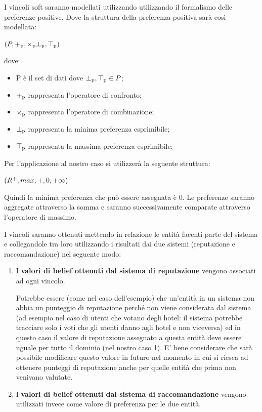 \documentclass[letterpaper]{article} %
\begin{document}
I vincoli soft saranno modellati utilizzando utilizzando il formalismo delle preferenze positive. Dove la struttura della preferenza positiva sarà così modellata:
\newline

$(P, +\textsubscript{p}, \times\textsubscript{p} \bot\textsubscript{p}, \top\textsubscript{p})$
\newline

dove:
\begin{itemize}
	\item
	P è il set di dati dove $\bot\textsubscript{p}, \top\textsubscript{p} \in P$;
	\item
	$+\textsubscript{p}$ rappresenta l'operatore di confronto;
	\item
	$\times\textsubscript{p}$ rappresenta l'operatore di combinazione;
	\item
	$\bot\textsubscript{p}$ rappresenta la minima preferenza esprimibile;
	\item
	$\top\textsubscript{p}$ rappresenta la massima preferenza esprimibile;
\end{itemize}


Per l'applicazione al nostro caso si utilizzerà la seguente struttura:
\newline

$(R\textsuperscript{+}, max, +, 0, +\infty)$
\newline

Quindi la minima preferenza che può essere assegnata è 0. Le preferenze saranno aggregate attraverso la somma e saranno successivamente comparate attraverso l'operatore di massimo. 

I vincoli saranno ottenuti mettendo in relazione le entità facenti parte del sistema e collegandole tra loro utilizzando i risultati dai due sistemi (reputazione e raccomandazione) nel seguente modo:

\begin{enumerate}
	\item 
	I \textbf{valori di belief ottenuti dal sistema di reputazione} vengono associati ad ogni vincolo. 
	
	Potrebbe essere (come nel caso dell'esempio) che un'entità in un sistema non abbia un punteggio di reputazione perché non viene considerata dal sistema (ad esempio nel caso di utenti che votano degli hotel: il sistema potrebbe tracciare solo i voti che gli utenti danno agli hotel e non viceversa) ed in questo caso il valore di reputazione assegnato a questa entità deve essere uguale per tutto il dominio (nel nostro caso 1). E' bene considerare che sarà possibile modificare questo valore in futuro nel momento in cui si riesca ad ottenere punteggi di reputazione anche per quelle entità che prima non venivano valutate.
	\item
	I \textbf{valori di belief ottenuti dal sistema di raccomandazione} vengono utilizzati invece come valore di preferenza per le due entità.
\end{enumerate}
\end{document}
